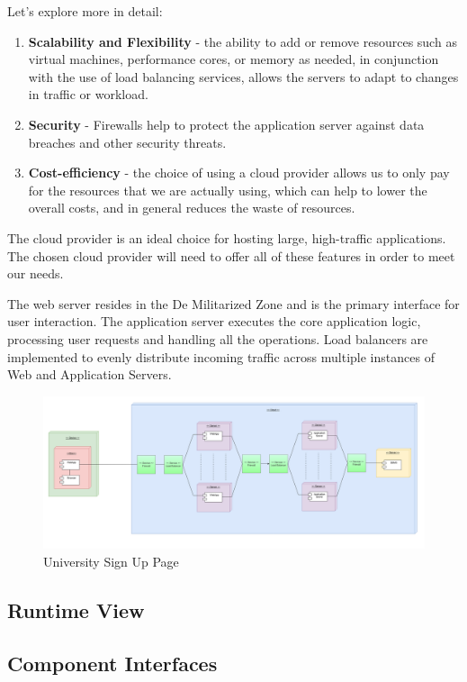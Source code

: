 \documentclass[a4paper,12pt]{article}
\begin{document}
Let's explore more in detail:

\begin{enumerate}
    \item \textbf{Scalability and Flexibility} - the ability to add or remove resources such as virtual machines, performance cores, or memory as needed, in conjunction with the use of load balancing services, allows the servers to adapt to changes in traffic or workload.
    \item \textbf{Security} - Firewalls help to protect the application server against data breaches and other security threats.
    \item \textbf{Cost-efficiency} - the choice of using a cloud provider allows us to only pay for the resources that we are actually using, which can help to lower the overall costs, and in general reduces the waste of resources.
\end{enumerate}

The cloud provider is an ideal choice for hosting large, high-traffic applications. The chosen cloud provider will need to offer all of these features in order to meet our needs.

The web server resides in the De Militarized Zone and is the primary interface for user interaction. The application server executes the core application logic, processing user requests and handling all the operations. Load balancers are implemented to evenly distribute incoming traffic across multiple instances of Web and Application Servers.
\begin{figure}[H]
    \centering
    \includegraphics[scale = 0.33]{DD_figures/SingleDiagrams/DeploymentView.png}
    \caption{University Sign Up Page}
    \centering
\end{figure}
\subsection{Runtime View}
\subsection{Component Interfaces}
\end{document}
